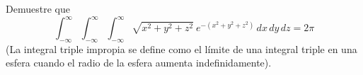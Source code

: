 \item Demuestre que
\[ \int_{-\infty}^\infty \int_{-\infty}^\infty \int_{-\infty}^\infty \sqrt{x^2 + y^2 + z^2} \ e^{-(x^2+y^2+z^2)} \, dx \, dy \, dz = 2\pi \]
(La integral triple impropia se define como el límite de una integral triple en una esfera cuando el radio de la esfera aumenta indefinidamente).
